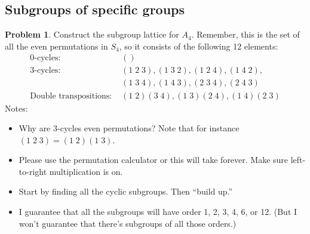 \documentclass[12pt]{article}
\theoremstyle{definition} %
\newtheorem{problem}{Problem}
\begin{document}
\subsection*{Subgroups of specific groups}

\begin{problem}
    Construct the subgroup lattice for $A_4$. Remember, this is the set of all the even permutations in $S_4$, so it consists of the following 12 elements:
    \begin{align*}
        0\text{-cycles: } &  () \\
        3\text{-cycles: } &  (1\; 2\; 3), (1\; 3\; 2), (1\; 2\; 4), (1\; 4\; 2),\\
        & (1\; 3\; 4), (1\; 4\; 3), (2\; 3\; 4), (2\; 4\; 3)\\
        \text{Double transpositions: } & (1\; 2)(3\; 4), (1\;3)(2\; 4), (1\; 4)(2\; 3)
    \end{align*}
    Notes:
    \begin{itemize}
        \item Why are 3-cycles even permutations? Note that for instance $(1\; 2\; 3) = (1\;2)(1\;3)$.
        \item Please use the permutation calculator or this will take forever. Make sure left-to-right multiplication is on.
        \item Start by finding all the cyclic subgroups. Then ``build up.''        
        \item I guarantee that all the subgroups will have order 1, 2, 3, 4, 6, or 12. (But I won't guarantee that there's subgroups of all those orders.)
    \end{itemize}
\end{problem}
\end{document}
